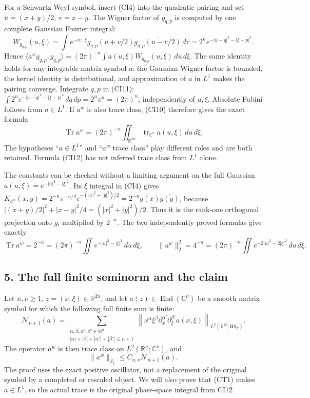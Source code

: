 \documentclass[
  11pt,
]{article}
\begin{document}
For a Schwartz Weyl symbol, insert (CI4) into the quadratic pairing and
set \(u=(x+y)/2,\ v=x-y\). The Wigner factor of \(g_{q,p}\) is computed
by one complete Gaussian Fourier integral: \[
 W_{g_{q,p}}(u,\xi)
 =\int e^{-iv\cdot\xi}
       g_{q,p}(u+v/2)\overline{g_{q,p}(u-v/2)}\,dv
 =2^n e^{-|u-q|^2-|\xi-p|^2}.
 \tag{CI11}
\] Hence \(\langle a^wg_{q,p},g_{q,p}\rangle
=(2\pi)^{-n}\int a(u,\xi)W_{g_{q,p}}(u,\xi)\,du\,d\xi\). The same
identity holds for any integrable matrix symbol \(a\): the Gaussian
Wigner factor is bounded, the kernel identity is distributional, and
approximation of \(a\) in \(L^1\) makes the pairing converge. Integrate
\(q,p\) in (CI11): \(\int 2^n e^{-|u-q|^2-|\xi-p|^2}\,dq\,dp
=2^n\pi^n=(2\pi)^n\), independently of \(u,\xi\). Absolute Fubini
follows from \(a\in L^1\). If \(a^w\) is also trace class, (CI10)
therefore gives the exact formula \[
 \operatorname{Tr}a^w
   =(2\pi)^{-n}\iint_{\mathbb R^{2n}}
          \operatorname{tr}_{\mathbb C^\nu}a(u,\xi)\,du\,d\xi .
 \tag{CI12}
\] The hypotheses ``\(a\in L^1\)'' and ``\(a^w\) trace class'' play
different roles and are both retained. Formula (CI12) has not inferred
trace class from \(L^1\) alone.

The constants can be checked without a limiting argument on the full
Gaussian \(a(u,\xi)=e^{-|u|^2-|\xi|^2}\). Its \(\xi\) integral in (CI4)
gives \(K_{a^w}(x,y)=2^{-n}\pi^{-n/2}e^{-(|x|^2+|y|^2)/2}
=2^{-n}g(x)\overline{g(y)}\), because
\(|(x+y)/2|^2+|x-y|^2/4=(|x|^2+|y|^2)/2\). Thus it is the rank-one
orthogonal projection onto \(g\), multiplied by \(2^{-n}\). The two
independently proved formulas give exactly \[
 \operatorname{Tr}a^w=2^{-n}
   =(2\pi)^{-n}\iint e^{-|u|^2-|\xi|^2}\,du\,d\xi,
 \qquad
 \|a^w\|_2^2=4^{-n}
   =(2\pi)^{-n}\iint e^{-2|u|^2-2|\xi|^2}\,du\,d\xi.
 \tag{CI13}
\]

\subsection{5. The full finite seminorm and the
claim}\label{the-full-finite-seminorm-and-the-claim}

Let \(n,\nu\ge1\), \(z=(x,\xi)\in\mathbb R^{2n}\), and let
\(a(z)\in\operatorname{End}(\mathbb C^\nu)\) be a smooth matrix symbol
for which the following full finite sum is finite: \[
 \mathcal N_{n+1}(a)
 =\sum_{\substack{\alpha,\beta,\alpha',\beta'\in\mathbb N^n\\
      |\alpha|+|\beta|+|\alpha'|+|\beta'|\le n+1}}
   \left\|x^\alpha\xi^\beta
      \partial_x^{\alpha'}\partial_\xi^{\beta'}a(x,\xi)
   \right\|_{L^2(\mathbb R^{2n};\mathrm{HS}_{\nu})}.
 \tag{CT1}
\] The operator \(a^w\) is then trace class on
\(L^2(\mathbb R^n;\mathbb C^\nu)\), and \[
 \|a^w\|_{\mathcal S_1}
    \le C_{n,\nu}\mathcal N_{n+1}(a).
 \tag{CT2}
\] The proof uses the exact positive oscillator, not a replacement of
the original symbol by a completed or rescaled object. We will also
prove that (CT1) makes \(a\in L^1\), so the actual trace is the original
phase-space integral from CI12.
\end{document}
